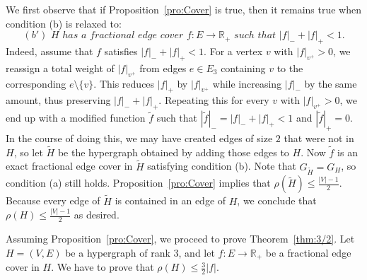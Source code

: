 \documentclass[10pt,a4paper]{amsart}
\begin{document}
We first observe that if Proposition~\ref{pro:Cover} is true, then it remains true when condition (b) is relaxed to: \[ (b')\,\, H\,\, has\,\, a\,\, fractional\,\, edge\,\, cover\,\,  f: E \to \mathbb{R}_+\,\,  such\,\, that\,\,  |f|_- + |f|_+ < 1.\] Indeed, assume that $f$ satisfies $|f|_- + |f|_+ < 1$. For a vertex $v$ with $|f|_{v^+} > 0$, we reassign a total weight of $|f|_{v^+}$ from edges $e \in E_3$ containing $v$ to the corresponding $e \setminus \{v\}$. This reduces $|f|_+$ by $|f|_{v^+}$ while increasing $|f|_-$ by the same amount, thus preserving $|f|_- + |f|_+$. Repeating this for every $v$ with $|f|_{v^+} > 0$, we end up with a modified function $\tilde{f}$ such that $|\tilde{f}|_- = |f|_- + |f|_+ < 1$ and $|\tilde{f}|_+ = 0$. In the course of doing this, we may have created edges of size $2$ that were not in $H$, so let $\tilde{H}$ be the hypergraph obtained by adding those edges to $H$. Now $\tilde{f}$ is an exact fractional edge cover in $\tilde{H}$ satisfying condition (b). Note that $G_{\tilde{H}} = G_H$, so condition (a) still holds. Proposition~\ref{pro:Cover} implies that $\rho(\tilde{H}) \le \frac{|V|-1}{2}$. Because every edge of $\tilde{H}$ is contained in an edge of $H$, we conclude that $\rho(H) \le \frac{|V|-1}{2}$ as desired.

Assuming Proposition~\ref{pro:Cover}, we proceed to prove Theorem~\ref{thm:3/2}. Let $H = (V, E)$ be a hypergraph of rank $3$, and let $f: E \to \mathbb{R}_+$ be a fractional edge cover in $H$. We have to prove that $\rho(H) \le \frac{3}{2} |f|$.
\end{document}
